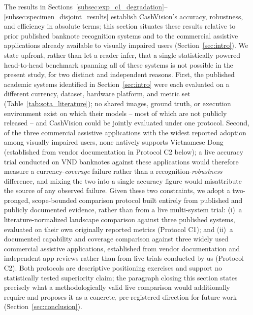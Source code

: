 \documentclass[final,5p,times,twocolumn,authoryear]{elsarticle}
\begin{document}
The results in Sections~\ref{subsec:exp_c1_degradation}--\ref{subsec:specimen_disjoint_results} establish CashVision's accuracy, robustness, and efficiency in absolute terms; this section situates these results relative to prior published banknote recognition systems and to the commercial assistive applications already available to visually impaired users (Section~\ref{sec:intro}). We state upfront, rather than let a reader infer, that a single statistically powered head-to-head benchmark spanning all of these systems is not possible in the present study, for two distinct and independent reasons. First, the published academic systems identified in Section~\ref{sec:intro} were each evaluated on a different currency, dataset, hardware platform, and metric set (Table~\ref{tab:sota_literature}); no shared images, ground truth, or execution environment exist on which their models -- most of which are not publicly released -- and CashVision could be jointly evaluated under one protocol. Second, of the three commercial assistive applications with the widest reported adoption among visually impaired users, none natively supports Vietnamese Dong (established from vendor documentation in Protocol C2 below); a live accuracy trial conducted on VND banknotes against these applications would therefore measure a currency-\emph{coverage} failure rather than a recognition-\emph{robustness} difference, and mixing the two into a single accuracy figure would misattribute the source of any observed failure. Given these two constraints, we adopt a two-pronged, scope-bounded comparison protocol built entirely from published and publicly documented evidence, rather than from a live multi-system trial: (i)~a literature-normalized landscape comparison against three published systems, evaluated on their own originally reported metrics (Protocol C1); and (ii)~a documented capability and coverage comparison against three widely used commercial assistive applications, established from vendor documentation and independent app reviews rather than from live trials conducted by us (Protocol C2). Both protocols are descriptive positioning exercises and support no statistically tested superiority claim; the paragraph closing this section states precisely what a methodologically valid live comparison would additionally require and proposes it as a concrete, pre-registered direction for future work (Section~\ref{sec:conclusion}).
\end{document}
